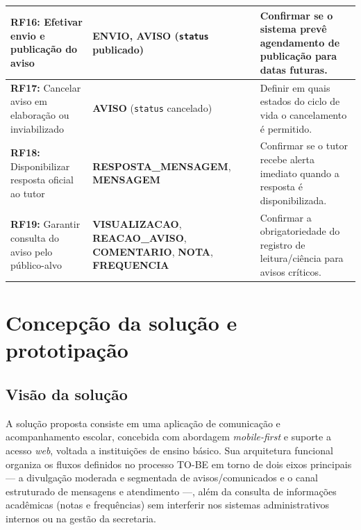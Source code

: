 \documentclass[a4paper,12pt]{report}
\begin{document}
\begin{longtable}{|p{3.4cm}|p{4.8cm}|p{6.4cm}|}
\hline
\textbf{RF16:} Efetivar envio e publicação do aviso & \textbf{ENVIO}, \textbf{AVISO} (\texttt{status} publicado) & Confirmar se o sistema prevê agendamento de publicação para datas futuras. \\
\hline
\textbf{RF17:} Cancelar aviso em elaboração ou inviabilizado & \textbf{AVISO} (\texttt{status} cancelado) & Definir em quais estados do ciclo de vida o cancelamento é permitido. \\
\hline
\textbf{RF18:} Disponibilizar resposta oficial ao tutor & \textbf{RESPOSTA\_MENSAGEM}, \textbf{MENSAGEM} & Confirmar se o tutor recebe alerta imediato quando a resposta é disponibilizada. \\
\hline
\textbf{RF19:} Garantir consulta do aviso pelo público-alvo & \textbf{VISUALIZACAO}, \textbf{REACAO\_AVISO}, \textbf{COMENTARIO}, \textbf{NOTA}, \textbf{FREQUENCIA} & Confirmar a obrigatoriedade do registro de leitura/ciência para avisos críticos. \\
\hline
\end{longtable}

\chapter{Concepção da solução e prototipação}

\section{Visão da solução}

A solução proposta consiste em uma aplicação de comunicação e acompanhamento escolar, concebida com abordagem \textit{mobile-first} e suporte a acesso \textit{web}, voltada a instituições de ensino básico. Sua arquitetura funcional organiza os fluxos definidos no processo TO-BE em torno de dois eixos principais — a divulgação moderada e segmentada de avisos/comunicados e o canal estruturado de mensagens e atendimento —, além da consulta de informações acadêmicas (notas e frequências) sem interferir nos sistemas administrativos internos ou na gestão da secretaria.
\end{document}

